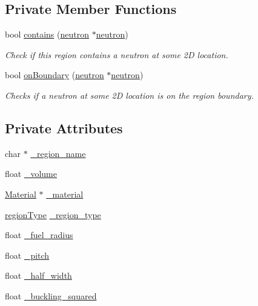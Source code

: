 \subsection*{Private Member Functions}
\begin{DoxyCompactItemize}
\item 
bool \hyperlink{classRegion_a056e2c3e94253b54b7715d6232c6fade}{contains} (\hyperlink{structneutron}{neutron} $\ast$\hyperlink{structneutron}{neutron})
\begin{DoxyCompactList}\small\item\em Check if this region contains a neutron at some 2\-D location. \end{DoxyCompactList}\item 
bool \hyperlink{classRegion_a725dd2c9786f1b0df1a4eb66b00cc0f2}{on\-Boundary} (\hyperlink{structneutron}{neutron} $\ast$\hyperlink{structneutron}{neutron})
\begin{DoxyCompactList}\small\item\em Checks if a neutron at some 2\-D location is on the region boundary. \end{DoxyCompactList}\end{DoxyCompactItemize}
\subsection*{Private Attributes}
\begin{DoxyCompactItemize}
\item 
char $\ast$ \hyperlink{classRegion_abf94b7a06d6b1500a77b68505868d312}{\-\_\-region\-\_\-name}
\item 
float \hyperlink{classRegion_ad4345a279ed2211c94a73c4bd1f28ba8}{\-\_\-volume}
\item 
\hyperlink{classMaterial}{Material} $\ast$ \hyperlink{classRegion_afeb207eb640d2543a9b5a1bb2097c50d}{\-\_\-material}
\item 
\hyperlink{Region_8h_a2c25b4a3d851e2d45d7a435a73598323}{region\-Type} \hyperlink{classRegion_a83913828a5b45d69aa073bc567a03750}{\-\_\-region\-\_\-type}
\item 
float \hyperlink{classRegion_a344918fd4f1847efd6be99f2326eaa87}{\-\_\-fuel\-\_\-radius}
\item 
float \hyperlink{classRegion_a378e08077c7f1dd45ed10dddf767415b}{\-\_\-pitch}
\item 
float \hyperlink{classRegion_a62b5f5e778d5e95d6289d0f0948a312c}{\-\_\-half\-\_\-width}
\item 
float \hyperlink{classRegion_a2731c8000023342a08a5799e0aa5c0d2}{\-\_\-buckling\-\_\-squared}
\end{DoxyCompactItemize}


